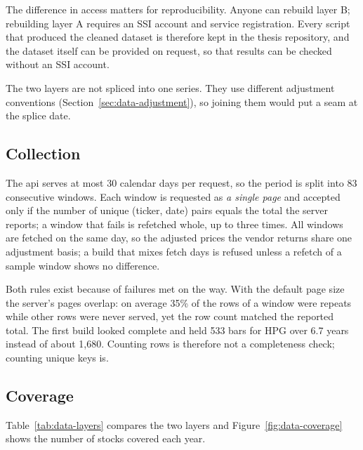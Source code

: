 The difference in access matters for reproducibility. Anyone can rebuild layer B; rebuilding
layer A requires an SSI account and service registration. Every script that produced the
cleaned dataset is therefore kept in the thesis repository, and the dataset itself can be
provided on request, so that results can be checked without an SSI account.

The two layers are not spliced into one series. They use different adjustment conventions
(Section~\ref{sec:data-adjustment}), so joining them would put a seam at the splice date.

\subsection{Collection}
\label{sec:data-collection}

The \gls{api} serves at most 30 calendar days per request, so the period is split into 83
consecutive windows. Each window is requested as \emph{a single page} and accepted only if the
number of unique (ticker, date) pairs equals the total the server reports; a window that fails
is refetched whole, up to three times. All windows are fetched on the same day, so the adjusted
prices the vendor returns share one adjustment basis; a build that mixes fetch days is refused
unless a refetch of a sample window shows no difference.

Both rules exist because of failures met on the way. With the default page size the server's
pages overlap: on average 35\% of the rows of a window were repeats while other rows were
never served, yet the row count matched the reported total. The first build looked complete
and held 533 bars for HPG over 6.7 years instead of about 1{,}680. Counting rows is therefore
not a completeness check; counting unique keys is.

\subsection{Coverage}

Table~\ref{tab:data-layers} compares the two layers and Figure~\ref{fig:data-coverage} shows
the number of stocks covered each year.

